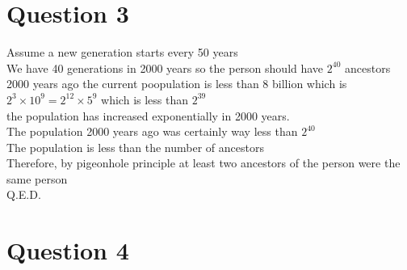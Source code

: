 \documentclass[11pt]{article}
\begin{document}
\section*{Question 3}
Assume a new generation starts every 50 years \\
We have 40 generations in 2000 years so the person should have $2^{40}$ ancestors 2000 years ago
the current poopulation is less than 8 billion which is $2^3 \times 10^9 = 2^{12} \times 5^9$
which is less than $2^{39}$ \\
the population has increased exponentially in 2000 years. \\
The population 2000 years ago was certainly way less than $2^{40}$ \\
The population is less than the number of ancestors \\
Therefore, by pigeonhole principle at least two ancestors of the person were
the same person \\
Q.E.D.


\section*{Question 4}
\end{document}
